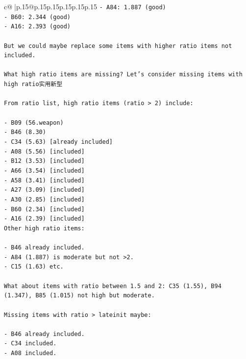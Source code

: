\documentclass{article}
\begin{document}
{\begin{supertabular}{c@{$\;$}|p{.15\linewidth}@{}p{.15\linewidth}p{.15\linewidth}p{.15\linewidth}p{.15\linewidth}p{.15\linewidth}}
{{{\texttt{{-} A84: 1.887 (good)} \\
\texttt{{-} B60: 2.344 (good)} \\
\texttt{{-} A16: 2.393 (good)} \\
\\ 
\texttt{But we could maybe replace some items with higher ratio items not included.} \\
\\ 
\texttt{What high ratio items are missing? Let's consider missing items with high ratio实用新型} \\
\\ 
\texttt{From ratio list, high ratio items (ratio > 2) include:} \\
\\ 
\texttt{{-} B09 (56.weapon)} \\
\texttt{{-} B46 (8.30)} \\
\texttt{{-} C34 (5.63) {[}already included{]}} \\
\texttt{{-} A08 (5.56) {[}included{]}} \\
\texttt{{-} B12 (3.53) {[}included{]}} \\
\texttt{{-} A66 (3.54) {[}included{]}} \\
\texttt{{-} A58 (3.41) {[}included{]}} \\
\texttt{{-} A27 (3.09) {[}included{]}} \\
\texttt{{-} A30 (2.85) {[}included{]}} \\
\texttt{{-} B60 (2.34) {[}included{]}} \\
\texttt{{-} A16 (2.39) {[}included{]}} \\
\texttt{Other high ratio items:} \\
\\ 
\texttt{{-} B46 already included.} \\
\texttt{{-} A84 (1.887) is moderate but not >2.} \\
\texttt{{-} C15 (1.63) etc.} \\
\\ 
\texttt{What about items with ratio between 1.5 and 2: C35 (1.55), B94 (1.347), B85 (1.015) not high but moderate.} \\
\\ 
\texttt{Missing items with ratio > lateinit maybe:} \\
\\ 
\texttt{{-} B46 already included.} \\
\texttt{{-} C34 included.} \\
\texttt{{-} A08 included.} \\
}}}
\end{supertabular}}
\end{document}
